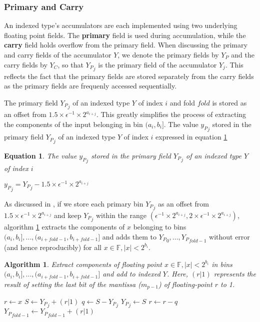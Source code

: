\documentclass[12pt]{article}
\providecommand{\F}{\ensuremath{\mathbb{F}}}
\theoremstyle{plain}
\newtheorem{alg}{Algorithm}[section]
\newtheorem{eq}{Equation}[section]
\begin{document}
    \subsubsection{Primary and Carry}
      An indexed type's accumulators are each implemented using two underlying floating point fields. The \textbf{primary} field is used during accumulation, while the \textbf{carry} field holds overflow from the primary field. When discussing the primary and carry fields of the accumulator $Y$, we denote the primary fields by $Y_P$ and the carry fields by $Y_C$, so that ${Y_P}_j$ is the primary field of the accumulator $Y_j$. This reflects the fact that the primary fields are stored separately from the carry fields as the primary fields are frequenly accessed sequentially.

      The primary field ${Y_P}_j$ of an indexed type $Y$ of index $i$ and fold $fold$ is stored as an offset from $1.5\times \epsilon^{-1} \times 2^{a_{i + j}}$. This greatly simplifies the process of extracting the components of the input belonging in bin $(a_i, b_i]$.
      The value ${y_P}_j$ stored in the primary field ${Y_P}_j$ of an indexed type $Y$ of index $i$ expressed in equation \ref{eq:pri}
      \begin{eq} The value ${y_P}_j$ stored in the primary field ${Y_P}_j$ of an indexed type $Y$ of index $i$

        ${y_P}_j = {Y_P}_j - 1.5\times\epsilon^{-1}\times2^{a_{i + j}}$
        \label{eq:pri}
      \end{eq}
      As discussed in \cite{repsum}, if we store each primary bin ${Y_P}_j$ as an offset from $1.5 \times \epsilon^{-1} \times 2^{a_{i + j}}$ and keep ${Y_P}_j$ within the range $(\epsilon^{-1} \times 2^{a_{i + j}}, 2 \times \epsilon^{-1} \times 2^{a_{i + j}})$, algorithm \ref{alg:deposit} extracts the components of $x$ belonging to bins $(a_i, b_i], ..., (a_{i + fold - 1}, b_{i + fold - 1}]$ and adds them to ${Y_P}_0, ..., {Y_P}_{fold - 1}$ without error (and hence reproducibly) for all $x \in \F, |x| < 2^{b_i}$.
      \begin{alg}
        Extract components of floating point $x \in \F, |x| < 2^{b_i}$ in bins $(a_i, b_i], ..., (a_{i + fold - 1}, b_{i + fold - 1}]$ and add to indexed $Y$. Here, $(r | 1)$ represents the result of setting the last bit of the mantissa ($m_{p - 1}$) of floating-point $r$ to 1.
        \begin{algorithmic}
            \State $r \gets x$
              \State $S \gets {Y_P}_j + (r | 1)$
              \State $q \gets S - {Y_P}_j$
              \State ${Y_P}_j \gets S$
              \State $r \gets r - q$
            \EndFor
            \State ${Y_P}_{fold - 1} \gets {Y_P}_{fold - 1} + (r | 1)$
          \EndFunction
        \end{algorithmic}
        \label{alg:deposit}
      \end{alg}
\end{document}
